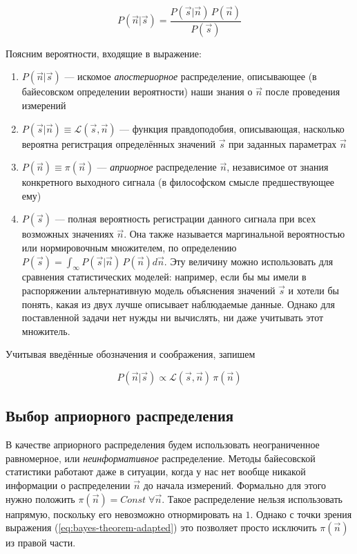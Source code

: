 \begin{equation}
	P(\vec{n} | \vec{s}) = \frac{P(\vec{s} | \vec{n}) \, P(\vec{n})}{P(\vec{s})}
\end{equation}

Поясним вероятности, входящие в выражение: 

\begin{enumerate}
	\item $P(\vec{n} | \vec{s})$ --- искомое \textit{апостериорное} распределение, описывающее (в байесовском определении вероятности) наши знания о $\vec{n}$ после проведения измерений
	\item $P(\vec{s} | \vec{n}) \equiv \mathcal{L}(\vec{s}, \vec{n})$ --- функция правдоподобия, описывающая, насколько вероятна регистрация определённых значений $\vec{s}$ при заданных параметрах $\vec{n}$
	\item $P(\vec{n}) \equiv \pi(\vec{n})$ --- \textit{априорное} распределение $\vec{n}$, независимое от знания конкретного выходного сигнала (в философском смысле предшествующее ему)
	\item $P(\vec{s})$ --- полная вероятность регистрации данного сигнала при всех возможных значениях $\vec{n}$. Она также называется маргинальной вероятностью или нормировочным множителем, по определению $P(\vec{s}) = \int_{\infty} P(\vec{s} | \vec{n}) \, P(\vec{n}) d\vec{n}$. Эту величину можно использовать для сравнения статистических моделей: например, если бы мы имели в распоряжении альтернативную модель объяснения значений $\vec{s}$ и хотели бы понять, какая из двух лучше описывает наблюдаемые данные. Однако для поставленной задачи нет нужды ни вычислять, ни даже учитывать этот множитель.
\end{enumerate}

Учитывая введённые обозначения и соображения, запишем

\begin{equation}
	\label{eq:bayes-theorem-adapted}
	P(\vec{n} | \vec{s}) \propto \mathcal{L}(\vec{s}, \vec{n}) \, \pi(\vec{n})
\end{equation}

\subsection{Выбор априорного распределения}
\label{sec:deconv-prior}

В качестве априорного распределения будем использовать неограниченное равномерное, или \textit{неинформативное} распределение. Методы байесовской статистики работают даже в ситуации, когда у нас нет вообще никакой информации о распределении $\vec{n}$ до начала измерений. Формально для этого нужно положить $\pi(\vec{n}) = Const \; \forall \vec{n}$. Такое распределение нельзя использовать напрямую, поскольку его невозможно отнормировать на $1$. Однако с точки зрения выражения (\ref{eq:bayes-theorem-adapted}) это позволяет просто исключить $\pi(\vec{n})$ из правой части.

